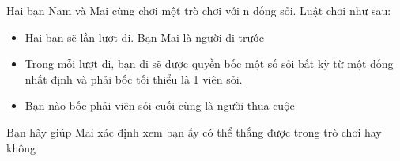 Hai bạn Nam và Mai cùng chơi một trò chơi với n đống sỏi. Luật chơi như sau:
\begin{itemize}
	\item Hai bạn sẽ lần lượt đi. Bạn Mai là người đi trước
	\item Trong mỗi lượt đi, bạn đi sẽ được quyền bốc một số sỏi bất kỳ từ một đống nhất định và phải bốc tối thiểu là 1 viên sỏi.
	\item Bạn nào bốc phải viên sỏi cuối cùng là người thua cuộc
\end{itemize}

Bạn hãy giúp Mai xác định xem bạn ấy có thể thắng được trong trò chơi hay không

\